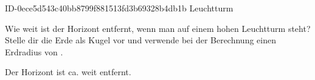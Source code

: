 \begin{exercise}
      {ID-0ece5d543c40bb8799f881513fd3b69328b4db1b}
      {Leuchtturm}
  \ifproblem\problem\par
    Wie weit ist der Horizont entfernt, wenn man auf einem  hohen
    Leuchtturm steht? Stelle dir die Erde als Kugel vor und verwende bei der
    Berechnung einen Erdradius von .
  \fi
  \ifoutcome\outcome\par
    Der Horizont ist ca.  weit entfernt.
  \fi
\end{exercise}
